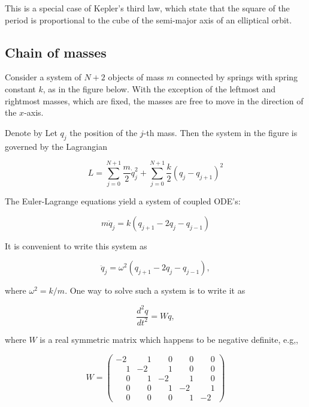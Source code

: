 This is a special case of Kepler's third law, which state that the square of the period is proportional to the cube of the semi-major axis of an elliptical orbit.





\subsection{Chain of masses}

Consider a system of $N+2$ objects of mass $m$ connected by springs with spring constant $k$, as in the figure below.  With the exception of the leftmost and rightmost masses, which are fixed, the masses are free to move in the direction of the $x$-axis.


Denote by Let $q_j$ the position of the $j$-th mass.  Then the system in the figure is governed by the Lagrangian

\begin{equation}
L = \sum_{j=0}^{N+1}\frac{m}{2} \dot q_j^2
+ \sum_{j=0}^{N+1}\frac{k}{2}  (q_j - q_{j+1})^2
\end{equation}

The Euler-Lagrange equations yield a system of coupled ODE's:

\begin{equation}
m\ddot q_j = k(q_{j+1} - 2q_j - q_{j-1} )
\end{equation}

It is convenient to write this system as

\begin{equation}
\label{discretestringodes}
\ddot q_j = \omega^2(q_{j+1} - 2q_j - q_{j-1} ),
\end{equation}

where $\omega^2 = k/m$.
One way to solve such a system is to write it as

\begin{equation}
\label{discretestringeqmo}
\frac{d^2 q}{dt^2} = Wq,
\end{equation}

where $W$ is a real symmetric matrix which happens to be negative definite, e.g,,

\begin{equation}
W =
\begin{pmatrix}
-2 & \phantom{-}1 & \phantom{-}0 & \phantom{-}0 & \phantom{-}0 \\
\phantom{-}1 & -2 & \phantom{-}1 & \phantom{-}0 & \phantom{-}0 \\
\phantom{-}0 & \phantom{-}1 & -2 & \phantom{-}1 & \phantom{-}0 \\
\phantom{-}0 & \phantom{-}0 & \phantom{-}1 & -2 & \phantom{-}1 \\
\phantom{-}0 & \phantom{-}0 & \phantom{-}0 & \phantom{-}1 & -2
\end{pmatrix}
\end{equation}

